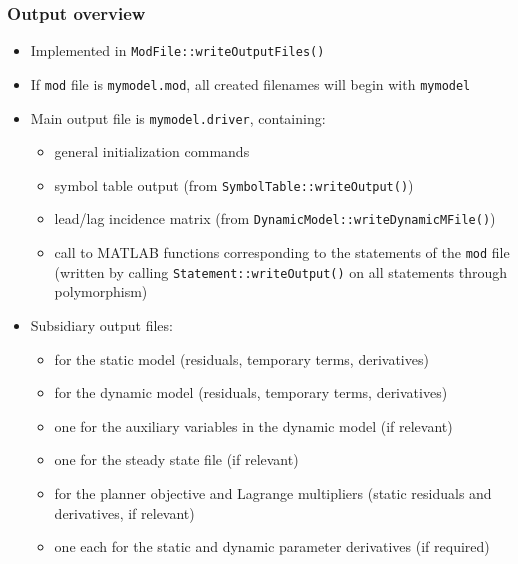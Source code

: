 \documentclass[aspectratio=169]{beamer}
\begin{document}
\begin{frame}
  \frametitle{Output overview}
  \begin{itemize}
  \item Implemented in \texttt{ModFile::writeOutputFiles()}
  \item If \texttt{mod} file is \texttt{mymodel.mod}, all created filenames will begin with \texttt{mymodel}
  \item Main output file is \texttt{mymodel.driver}, containing:
    \begin{itemize}
    \item general initialization commands
    \item symbol table output (from \texttt{SymbolTable::writeOutput()})
    \item lead/lag incidence matrix (from \texttt{DynamicModel::writeDynamicMFile()})
    \item call to MATLAB functions corresponding to the statements of the \texttt{mod} file (written by calling \texttt{Statement::writeOutput()} on all statements through polymorphism)
    \end{itemize}
  \item Subsidiary output files:
    \begin{itemize}
    \item for the static model (residuals, temporary terms, derivatives)
    \item for the dynamic model (residuals, temporary terms, derivatives)
    \item one for the auxiliary variables in the dynamic model (if relevant)
    \item one for the steady state file (if relevant)
    \item for the planner objective and Lagrange multipliers (static residuals and derivatives, if relevant)
    \item one each for the static and dynamic parameter derivatives (if required)
    \end{itemize}
  \end{itemize}
\end{frame}
\end{document}
